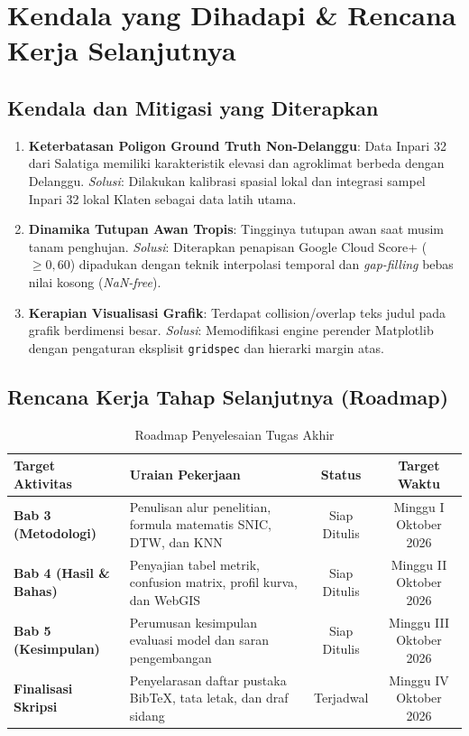 \documentclass[11pt,a4paper]{article}
\begin{document}
\section{Kendala yang Dihadapi \& Rencana Kerja Selanjutnya}

\subsection{Kendala dan Mitigasi yang Diterapkan}
\begin{enumerate}
    \item \textbf{Keterbatasan Poligon Ground Truth Non-Delanggu}: Data Inpari 32 dari Salatiga memiliki karakteristik elevasi dan agroklimat berbeda dengan Delanggu. \textit{Solusi}: Dilakukan kalibrasi spasial lokal dan integrasi sampel Inpari 32 lokal Klaten sebagai data latih utama.
    \item \textbf{Dinamika Tutupan Awan Tropis}: Tingginya tutupan awan saat musim tanam penghujan. \textit{Solusi}: Diterapkan penapisan Google Cloud Score+ ($\ge 0{,}60$) dipadukan dengan teknik interpolasi temporal dan \textit{gap-filling} bebas nilai kosong (\textit{NaN-free}).
    \item \textbf{Kerapian Visualisasi Grafik}: Terdapat collision/overlap teks judul pada grafik berdimensi besar. \textit{Solusi}: Memodifikasi engine perender Matplotlib dengan pengaturan eksplisit \texttt{gridspec} dan hierarki margin atas.
\end{enumerate}

\subsection{Rencana Kerja Tahap Selanjutnya (Roadmap)}
\begin{table}[H]
    \centering\small
    \caption{Roadmap Penyelesaian Tugas Akhir}
    \begin{tabularx}{\textwidth}{lXcc}
        \toprule
        \textbf{Target Aktivitas} & \textbf{Uraian Pekerjaan} & \textbf{Status} & \textbf{Target Waktu} \\
        \midrule
        \textbf{Bab 3 (Metodologi)} & Penulisan alur penelitian, formula matematis SNIC, DTW, dan KNN & Siap Ditulis & Minggu I Oktober 2026 \\
        \textbf{Bab 4 (Hasil \& Bahas)} & Penyajian tabel metrik, confusion matrix, profil kurva, dan WebGIS & Siap Ditulis & Minggu II Oktober 2026 \\
        \textbf{Bab 5 (Kesimpulan)}   & Perumusan kesimpulan evaluasi model dan saran pengembangan & Siap Ditulis & Minggu III Oktober 2026 \\
        \textbf{Finalisasi Skripsi}   & Penyelarasan daftar pustaka BibTeX, tata letak, dan draf sidang & Terjadwal & Minggu IV Oktober 2026 \\
        \bottomrule
    \end{tabularx}
\end{table}
\end{document}
